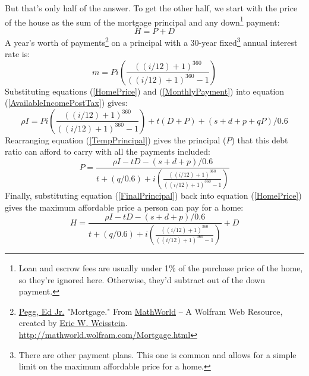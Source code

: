 \documentclass{article}
\begin{document}
But that's only half of the answer. To get the other half, we 
 start with the 
price of the house as the sum of the mortgage principal and any
 down\footnote{
Loan and escrow fees are usually under 1\% of the purchase price of
 the home, so 
they're ignored here. Otherwise, they'd subtract out of the down
 payment.} payment:
\begin{equation}
\label{HomePrice}
H = P + D
\end{equation}
A year's worth of payments\footnote{
\href{http://mathworld.wolfram.com/topics/Pegg.html}{Pegg, Ed Jr.} "Mortgage." From 
\href{http://mathworld.wolfram.com/}{MathWorld} -- A Wolfram Web Resource, created by 
\href{http://mathworld.wolfram.com/about/author.html}{Eric W. Weisstein}. 
\url{http://mathworld.wolfram.com/Mortgage.html}}
 on a principal with a 30-year fixed\footnote{
There are other payment plans. This one is common and allows
for a simple limit on the maximum affordable price for a home.} 
annual interest rate is:
\begin{equation}
\label{MonthlyPayment}
m = Pi \left( \frac{((i/12) + 1)^{360}}{((i/12) + 1)^{360} - 1} \right)
\end{equation}
Substituting equations (\ref{HomePrice}) and (\ref{MonthlyPayment}) into 
equation (\ref{AvailableIncomePostTax}) gives:
\begin{equation}
\label{TempPrincipal}
\rho I = P i \left( \frac{((i/12) + 1)^{360}}{((i/12) + 1)^{360} - 1} \right)
+ t(D + P) + (s + d + p + qP) / 0.6
\end{equation}
Rearranging equation (\ref{TempPrincipal}) gives the principal ($P$) that 
this debt ratio can afford to carry with all the payments included:
\begin{equation}
\label{FinalPrincipal}
P = \frac{\rho I - tD - (s + d + p) / 0.6}{t + (q / 0.6) +
i \left( \frac{((i/12) + 1)^{360}}{((i/12) + 1)^{360} - 1} \right)}
\end{equation}
Finally, substituting equation (\ref{FinalPrincipal}) back into equation
 (\ref{HomePrice}) gives the maximum affordable price a person can pay 
for a home:
\begin{equation}
\label{FinalHomePrice}
H = \frac{\rho I - tD - (s + d + p) / 0.6}{t + (q / 0.6) +
i \left( \frac{((i/12) + 1)^{360}}{((i/12) + 1)^{360} - 1} \right)} + D
\end{equation}
\end{document}
